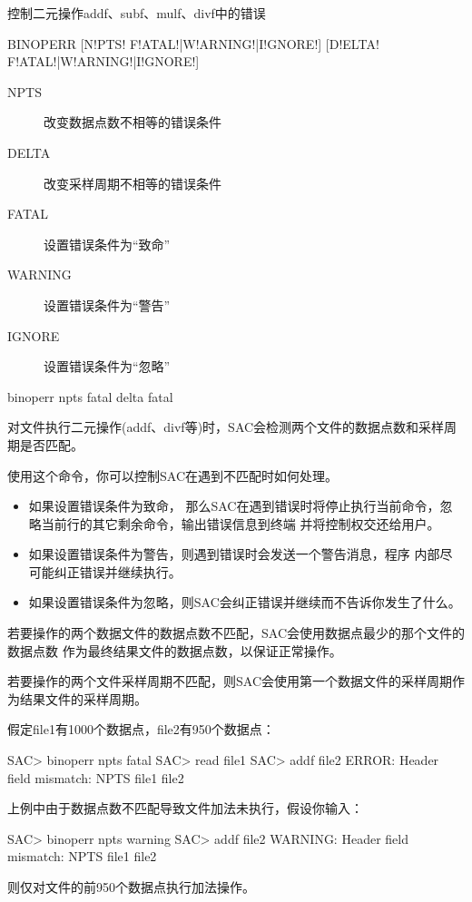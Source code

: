\label{cmd:binoperr}

控制二元操作addf、subf、mulf、divf中的错误

\begin{SACSTX}
BINOPERR [N!PTS! F!ATAL!|W!ARNING!|I!GNORE!] [D!ELTA! F!ATAL!|W!ARNING!|I!GNORE!]
\end{SACSTX}

\begin{description}
\item [NPTS]  改变数据点数不相等的错误条件
\item [DELTA] 改变采样周期不相等的错误条件
\item [FATAL] 设置错误条件为``致命''
\item [WARNING] 设置错误条件为``警告''
\item [IGNORE]  设置错误条件为``忽略''
\end{description}

\begin{SACDFT}
binoperr npts fatal delta fatal
\end{SACDFT}

对文件执行二元操作(addf、divf等)时，SAC会检测两个文件的数据点数和采样周期是否匹配。

使用这个命令，你可以控制SAC在遇到不匹配时如何处理。
\begin{itemize}
\item 如果设置错误条件为致命，
那么SAC在遇到错误时将停止执行当前命令，忽略当前行的其它剩余命令，输出错误信息到终端
并将控制权交还给用户。
\item 如果设置错误条件为警告，则遇到错误时会发送一个警告消息，程序
内部尽可能纠正错误并继续执行。
\item 如果设置错误条件为忽略，则SAC会纠正错误并继续而不告诉你发生了什么。
\end{itemize}

若要操作的两个数据文件的数据点数不匹配，SAC会使用数据点最少的那个文件的数据点数
作为最终结果文件的数据点数，以保证正常操作。

若要操作的两个文件采样周期不匹配，则SAC会使用第一个数据文件的采样周期作为结果文件的采样周期。

假定file1有1000个数据点，file2有950个数据点：
\begin{SACCode}
SAC> binoperr npts fatal
SAC> read file1
SAC> addf file2
ERROR:  Header field mismatch: NPTS file1 file2
\end{SACCode}

上例中由于数据点数不匹配导致文件加法未执行，假设你输入：
\begin{SACCode}
SAC> binoperr npts warning
SAC> addf file2
WARNING:  Header field mismatch: NPTS file1 file2
\end{SACCode}
则仅对文件的前950个数据点执行加法操作。
